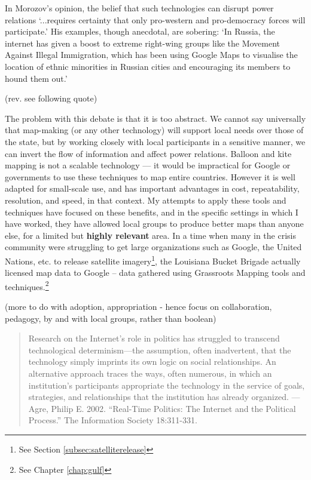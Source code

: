 \documentclass[11pt,oneside,notitlepage]{report}
\begin{document}
In Morozov's opinion, the belief that such technologies can disrupt power relations `...requires certainty that only pro-western and pro-democracy forces will participate.' His examples, though anecdotal, are sobering: `In Russia, the internet has given a boost to extreme right-wing groups like the Movement Against Illegal Immigration, which has been using Google Maps to visualise the location of ethnic minorities in Russian cities and encouraging its members to hound them out.' 

(rev. see following quote)

The problem with this debate is that it is too abstract. We cannot say universally that map-making (or any other technology) will support local needs over those of the state, but by working closely with local participants in a sensitive manner, we can invert the flow of information and affect power relations. Balloon and kite mapping is not a scalable technology --- it would be impractical for Google or governments to use these techniques to map entire countries. However it is well adapted for small-scale use, and has important advantages in cost, repeatability, resolution, and speed, in that context. My attempts to apply these tools and techniques have focused on these benefits, and in the specific settings in which I have worked, they have allowed local groups to produce better maps than anyone else, for a limited but \textbf{highly relevant} area. In a time when many in the crisis community were struggling to get large organizations such as Google, the United Nations, etc. to release satellite imagery\footnote{See Section \ref{subsec:satelliterelease}}, the Louisiana Bucket Brigade actually licensed map data to Google -- data gathered using Grassroots Mapping tools and techniques.\footnote{See Chapter \ref{chap:gulf}} 

(more to do with adoption, appropriation - hence focus on collaboration, pedagogy, by and with local groups, rather than boolean)

\begin{quote}
Research on the Internet’s role in politics has struggled to transcend technological determinism—the assumption, often inadvertent, that the technology simply imprints its own logic on social relationships. An alternative approach traces the ways, often numerous, in which an institution’s participants appropriate the technology in the service of goals, strategies, and relationships that the institution has already organized. --- Agre, Philip E. 2002. “Real-Time Politics: The Internet and the Political Process.” The Information Society 18:311-331.
\end{quote}
\end{document}
